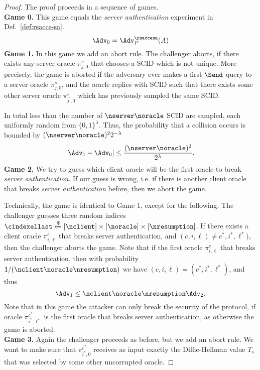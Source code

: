 \begin{proof}
 The proof proceeds in a sequence of games. \vspace{10pt}\\
 {\bfseries Game 0.} This game equals the \textit{server authentication} experiment in Def.~\ref{def:rsacce-sa}.\\
 \begin{equation}
  \Adv_0 = \Adv^{\rsaccesa}_{P}(A)
 \end{equation}%
%
%
 \textbf{Game 1.} In this game we add an abort rule.
 The challenger aborts, if there exists any server oracle $\pi^s_{j, 0}$
  that chooses a SCID which is not unique.
 More precisely, the game is aborted if the adversary ever makes a first $\Send$ query to a server oracle $\pi^s_{j, 0}$, and the oracle replies with SCID such that there exists some other server oracle $\pi^{s^{\prime}}_{j^{\prime}, 0}$ which has previously sampled the same SCID.

 In total less than the number of $\nserver \noracle$ SCID are sampled, each uniformly random from $\{0,1\}^{\lambda}$.
 Thus, the probability that a collision occurs is bounded by $(\nserver \noracle)^2 2^{-\lambda}$
 \begin{equation}
  |\Adv_1 - \Adv_0| \leq \frac{(\nserver \noracle)^2}{2^{\lambda}}.
 \end{equation}%
%
%
 \textbf{Game 2.} We try to guess which client oracle will be the first oracle to break \textit{server authentication}. If our guess is wrong, i.e. if there is another client oracle that breaks \textit{server authentication} before, then we abort the game.

 Technically, the game is identical to Game 1, except for the following. The challenger guesses three random indices $\cindexellast \xleftarrow{\$} [\nclient] \times [\noracle] \times [\nresumption]$. If there exists a client oracle $\pi^c_{i,\ell}$ that breaks server authentication, and $(c, i, \ell) \neq c^{\ast}, i^{\ast}, \ell^{\ast})$, then the challenger aborts the game. Note that if the first oracle $\pi^c_{i,\ell}$ that breaks server authentication, then with probability $1/(\nclient \noracle \nresumption)$ we have $(c,i,\ell) = (c^{\ast}, i^{\ast}, \ell^{\ast})$, and thus
 \begin{equation}
  \Adv_1 \leq \nclient \noracle \nresumption \Adv_2.
 \end{equation}%
 Note that in this game the attacker can only break the security of the protocol, if oracle $\pi^{c^{\ast}}_{i^{\ast},\ell^{\ast}}$ is the first oracle that breaks server authentication, as otherwise the game is aborted.
\vspace{10pt}\\%
%
%
 \textbf{Game 3.} Again the challenger proceeds as before, but we add an abort rule. We want to make sure that $\pi^{c^\ast}_{i^{\ast},0}$ receives as input exactly the Diffie-Hellman value $T_s$ that was selected by some other uncorrupted oracle.


\end{proof}
